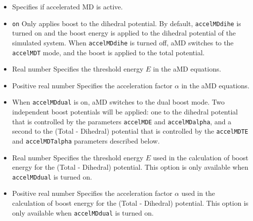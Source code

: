 \begin{itemize}

\item
{}
{Specifies if accelerated MD is active.}

\item
{} {{\tt on}} 
{Only applies boost to the dihedral potential. 
By default, {\tt accelMDdihe} is turned on and the boost energy is applied to the dihedral potential of the simulated system.
When {\tt accelMDdihe} is turned off, aMD switches to the {\tt accelMDT} mode, and the boost is applied to the total potential.
}

\item
{}
{Real number}
{Specifies the threshold energy $E$ in the aMD equations. 
}

\item
{}
{Positive real number}
{Specifies the acceleration factor $\alpha$ in the aMD equations. 
}

\item
{}
{When {\tt accelMDdual} is on, aMD switches to the dual boost mode. Two independent boost potentials 
will be applied: one to the dihedral potential that is controlled by the parameters {\tt accelMDE} and {\tt accelMDalpha},
and a second to the (Total - Dihedral) potential that is controlled by the  {\tt accelMDTE} and {\tt accelMDTalpha} parameters described below.
}

\item
{}
{Real number}
{Specifies the threshold energy $E$ used in the calculation of boost energy for the (Total - Dihedral) potential. 
This option is only available when {\tt accelMDdual} is turned on.
}

\item
{}
{Positive real number}
{Specifies the acceleration factor $\alpha$ used in the calculation of boost energy for the (Total - Dihedral) potential. 
This option is only available when {\tt accelMDdual} is turned on.
}


\end{itemize}
